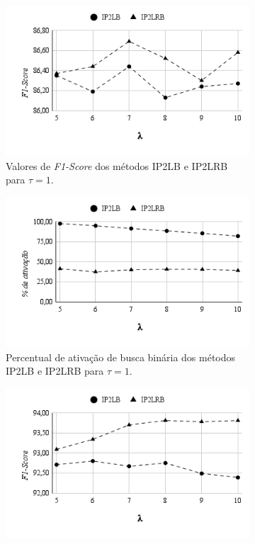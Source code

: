\begin{figure}[h]
    \centering
    \begin{subfigure}[b]{0.49\textwidth}
        \includegraphics[width=\textwidth]{figures/f1-score-tau-1.png}
        \caption{Valores de \textit{F1-Score} dos métodos IP2LB e IP2LRB para $\tau=1$.}
        \label{fig:f1_score_tau_1}
    \end{subfigure}
    \begin{subfigure}[b]{0.49\textwidth}
        \includegraphics[width=\textwidth]{figures/binary-activation-tau-1.png}
        \caption{Percentual de ativação de busca binária dos métodos IP2LB e IP2LRB para $\tau=1$.}
        \label{fig:binary_activation_tau_1}
    \end{subfigure}
    \begin{subfigure}[b]{0.49\textwidth}
        \includegraphics[width=\textwidth]{figures/f1-score-tau-2.png}

\end{subfigure}
\end{figure}
